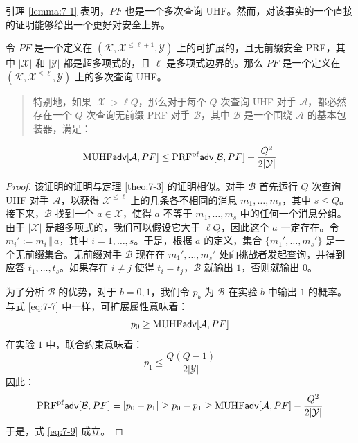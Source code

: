 \begin{snote}
引理 \ref{lemma:7-1} 表明，$PF$ 也是一个多次查询 UHF。然而，对该事实的一个直接的证明能够给出一个更好对安全上界。
\end{snote}

\begin{theorem}\label{theo:7-4}
令 $PF$ 是一个定义在 $(\mathcal{K},\mathcal{X}^{\leq\ell+1},\mathcal{Y})$ 上的可扩展的，且无前缀安全 PRF，其中 $|\mathcal{X}|$ 和 $|\mathcal{Y}|$ 都是超多项式的，且 $\ell$ 是多项式边界的。那么 $PF$ 是一个定义在 $(\mathcal{K},\mathcal{X}^{\leq\ell},\mathcal{Y})$ 上的多次查询 UHF。
\begin{quote}
特别地，如果 $|\mathcal{X}|>\ell Q$，那么对于每个 $Q$ 次查询 UHF 对手 $\mathcal{A}$，都必然存在一个 $Q$ 次查询无前缀 PRF 对手 $\mathcal{B}$，其中 $\mathcal{B}$ 是一个围绕 $\mathcal{A}$ 的基本包装器，满足：
\end{quote}
\begin{equation}\label{eq:7-9}
{\rm MUHF}\mathsf{adv}[\mathcal{A},PF]\leq{\rm PRF^{pf}} \mathsf{adv}[\mathcal{B},PF]+\frac{Q^2}{2|\mathcal{Y}|}
\end{equation}
\end{theorem}

\begin{proof}
该证明的证明与定理 \ref{theo:7-3} 的证明相似。对手 $\mathcal{B}$ 首先运行 $Q$ 次查询 UHF 对手 $\mathcal{A}$，以获得 $\mathcal{X}^{\leq\ell}$ 上的几条各不相同的消息 $m_1,\dots,m_s$，其中 $s\leq Q$。接下来，$\mathcal{B}$ 找到一个 $a\in\mathcal{X}$，使得 $a$ 不等于 $m_1,\dots,m_s$ 中的任何一个消息分组。由于 $|\mathcal{X}|$ 是超多项式的，我们可以假设它大于 $\ell Q$，因此这个 $a$ 一定存在。令 $m_i':=m_i\,\Vert\,a$，其中 $i=1,\dots,s$。于是，根据 $a$ 的定义，集合 $\{m_1',\dots,m_s'\}$ 是一个无前缀集合。无前缀对手 $\mathcal{B}$ 现在在 $m_1',\dots,m_s'$ 处向挑战者发起查询，并得到应答 $t_1,\dots,t_s$。如果存在 $i\neq j$ 使得 $t_i=t_j$，$\mathcal{B}$ 就输出 $1$，否则就输出 $0$。

为了分析 $\mathcal{B}$ 的优势，对于 $b=0,1$，我们令 $p_b$ 为 $\mathcal{B}$ 在实验 $b$ 中输出 $1$ 的概率。与式 \ref{eq:7-7} 中一样，可扩展属性意味着：
\[
p_0\geq{\rm MUHF}\mathsf{adv}[\mathcal{A},PF]
\]
在实验 $1$ 中，联合约束意味着：
\[
p_1\leq\frac{Q(Q-1)}{2|\mathcal{Y}|}
\]
因此：
\[
{\rm PRF^{pf}}\mathsf{adv}[\mathcal{B},PF]=|p_0-p_1|\geq p_0-p_1\geq{\rm MUHF}\mathsf{adv}[\mathcal{A},PF]-\frac{Q^2}{2|\mathcal{Y}|}
\]
于是，式 \ref{eq:7-9} 成立。
\end{proof}

